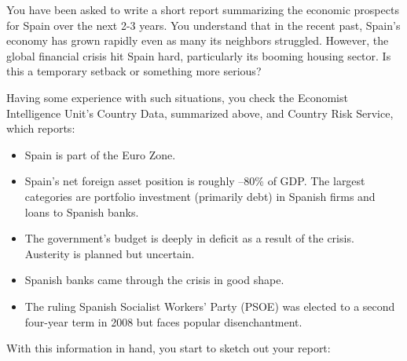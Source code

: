 \documentclass[letterpaper,12pt]{exam}
\begin{document}
\begin{questions}
You have been asked to write a short report summarizing 
the economic prospects for Spain over the next 2-3 years.  
You understand that in the recent past, 
Spain's economy has grown rapidly 
even as many its neighbors struggled.  
However, the global financial crisis hit Spain hard, 
particularly its booming housing sector.  
Is this a temporary setback or something more serious?  

Having some experience with such situations, 
you check the Economist Intelligence Unit's Country Data, 
summarized above, 
and Country Risk Service, 
which reports:  
%
\begin{itemize}
\item Spain is part of the Euro Zone.  
\item Spain's net foreign asset position is roughly --80\% of GDP.  
The largest categories are portfolio investment
(primarily debt) in Spanish firms and loans to Spanish banks.  
\item The government's budget is deeply in deficit
as a result of the crisis.  
Austerity is planned but uncertain.  
\item Spanish banks came through the crisis in good shape.  
\item The ruling Spanish Socialist Workers' Party (PSOE)
was elected to a second four-year term in 2008 
but faces popular disenchantment. 
\end{itemize}

With this information in hand, you start to sketch out your report:  



\end{questions}
\end{document}
